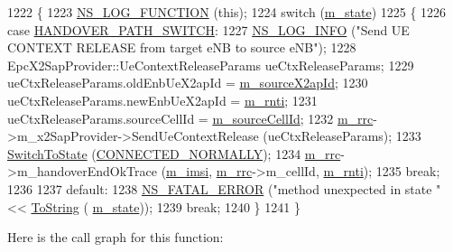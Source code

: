 \begin{DoxyCode}
1222 \{
1223   \hyperlink{log-macros-disabled_8h_a90b90d5bad1f39cb1b64923ea94c0761}{NS\_LOG\_FUNCTION} (\textcolor{keyword}{this});
1224   \textcolor{keywordflow}{switch} (\hyperlink{classns3_1_1UeManager_aaed4b2490297cb912e743084f1a27b08}{m\_state})
1225     \{
1226     \textcolor{keywordflow}{case} \hyperlink{classns3_1_1UeManager_a2f4085fdd18d7125c27da44a5b8b6808a66ee8994a912a463763b439ac0f158f2}{HANDOVER\_PATH\_SWITCH}:
1227       \hyperlink{group__logging_gafbd73ee2cf9f26b319f49086d8e860fb}{NS\_LOG\_INFO} (\textcolor{stringliteral}{"Send UE CONTEXT RELEASE from target eNB to source eNB"});
1228       EpcX2SapProvider::UeContextReleaseParams ueCtxReleaseParams;
1229       ueCtxReleaseParams.oldEnbUeX2apId = \hyperlink{classns3_1_1UeManager_aec435692a673cd55353a2bb258d5f487}{m\_sourceX2apId};
1230       ueCtxReleaseParams.newEnbUeX2apId = \hyperlink{classns3_1_1UeManager_a5a72b4fe818f21993bd7f05d7e2c4f83}{m\_rnti};
1231       ueCtxReleaseParams.sourceCellId = \hyperlink{classns3_1_1UeManager_add9ed1d405182617c513205fab32d470}{m\_sourceCellId};
1232       \hyperlink{classns3_1_1UeManager_ab4405e9f354c66e7c1a4c95832290f5b}{m\_rrc}->m\_x2SapProvider->SendUeContextRelease (ueCtxReleaseParams);
1233       \hyperlink{classns3_1_1UeManager_af2b5ad90fc6f16ffc4a91fbe8a522472}{SwitchToState} (\hyperlink{classns3_1_1UeManager_a2f4085fdd18d7125c27da44a5b8b6808a2a1020dce30f19aa9354ba34b2e7c5e0}{CONNECTED\_NORMALLY});
1234       \hyperlink{classns3_1_1UeManager_ab4405e9f354c66e7c1a4c95832290f5b}{m\_rrc}->m\_handoverEndOkTrace (\hyperlink{classns3_1_1UeManager_a868dda076ecfc1d4202e357c16223d84}{m\_imsi}, \hyperlink{classns3_1_1UeManager_ab4405e9f354c66e7c1a4c95832290f5b}{m\_rrc}->m\_cellId, 
      \hyperlink{classns3_1_1UeManager_a5a72b4fe818f21993bd7f05d7e2c4f83}{m\_rnti});
1235       \textcolor{keywordflow}{break};
1236 
1237     \textcolor{keywordflow}{default}:
1238       \hyperlink{group__fatal_ga5131d5e3f75d7d4cbfd706ac456fdc85}{NS\_FATAL\_ERROR} (\textcolor{stringliteral}{"method unexpected in state "} << \hyperlink{namespacens3_a3d1f7e1bec1972e2ae8d64673fcfcd9c}{ToString} (
      \hyperlink{classns3_1_1UeManager_aaed4b2490297cb912e743084f1a27b08}{m\_state}));
1239       \textcolor{keywordflow}{break};
1240     \}
1241 \}
\end{DoxyCode}


Here is the call graph for this function\+:


